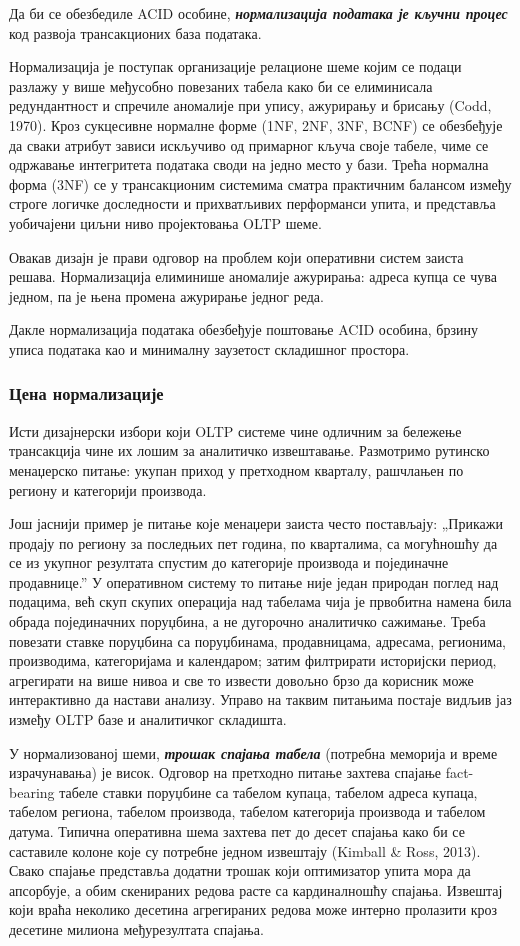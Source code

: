 Да би се обезбедиле ACID особине, \textbf{\textit{нормализација података је кључни процес}} код развоја трансакционих база података.

Нормализација је поступак организације релационе шеме којим се подаци разлажу у више међусобно повезаних табела како би се елиминисала редундантност и спречиле аномалије при упису, ажурирању и брисању (Codd, 1970). Кроз сукцесивне нормалне форме (1NF, 2NF, 3NF, BCNF) се обезбеђује да сваки атрибут зависи искључиво од примарног кључа своје табеле, чиме се одржавање интегритета података своди на једно место у бази. Трећа нормална форма (3NF) се у трансакционим системима сматра практичним балансом између строге логичке доследности и прихватљивих перформанси упита, и представља уобичајени циљни ниво пројектовања OLTP шеме.

Овакав дизајн је прави одговор на проблем који оперативни систем заиста решава. Нормализација елиминише аномалије ажурирања: адреса купца се чува једном, па је њена промена ажурирање једног реда.  

Дакле нормализација података обезбеђује поштовање ACID особина, брзину уписа података као и минималну заузетост складишног простора.

\subsubsection{Цена нормализације}
Исти дизајнерски избори који OLTP системе чине одличним за бележење трансакција чине их лошим за аналитичко извештавање. Размотримо рутинско менаџерско питање: укупан приход у претходном кварталу, рашчлањен по региону и категорији производа.

Још јаснији пример је питање које менаџери заиста често постављају: „Прикажи продају по региону за последњих пет година, по кварталима, са могућношћу да се из укупног резултата спустим до категорије производа и појединачне продавнице.” У оперативном систему то питање није један природан поглед над подацима, већ скуп скупих операција над табелама чија је првобитна намена била обрада појединачних поруџбина, а не дугорочно аналитичко сажимање. Треба повезати ставке поруџбина са поруџбинама, продавницама, адресама, регионима, производима, категоријама и календаром; затим филтрирати историјски период, агрегирати на више нивоа и све то извести довољно брзо да корисник може интерактивно да настави анализу. Управо на таквим питањима постаје видљив јаз између OLTP базе и аналитичког складишта.

У нормализованој шеми, \textbf{\textit{трошак спајања табела}} (потребна меморија и време израчунавања) је висок. Одговор на претходно питање захтева спајање fact-bearing табеле ставки поруџбине са табелом купаца, табелом адреса купаца, табелом региона, табелом производа, табелом категорија производа и табелом датума. Типична оперативна шема захтева пет до десет спајања како би се саставиле колоне које су потребне једном извештају (Kimball \& Ross, 2013). Свако спајање представља додатни трошак који оптимизатор упита мора да апсорбује, а обим скенираних редова расте са кардиналношћу спајања. Извештај који враћа неколико десетина агрегираних редова може интерно пролазити кроз десетине милиона међурезултата спајања.

